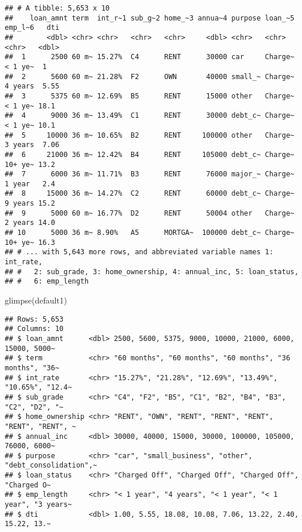 \documentclass[
]{article}
\newenvironment{Shaded}{\begin{snugshade}}{\end{snugshade}}
\newcommand{\FunctionTok}[1]{\textcolor[rgb]{0.00,0.00,0.00}{#1}}
\newcommand{\NormalTok}[1]{#1}
\begin{document}
\begin{verbatim}
## # A tibble: 5,653 x 10
##    loan_amnt term  int_r~1 sub_g~2 home_~3 annua~4 purpose loan_~5 emp_l~6   dti
##        <dbl> <chr> <chr>   <chr>   <chr>     <dbl> <chr>   <chr>   <chr>   <dbl>
##  1      2500 60 m~ 15.27%  C4      RENT      30000 car     Charge~ < 1 ye~  1   
##  2      5600 60 m~ 21.28%  F2      OWN       40000 small_~ Charge~ 4 years  5.55
##  3      5375 60 m~ 12.69%  B5      RENT      15000 other   Charge~ < 1 ye~ 18.1 
##  4      9000 36 m~ 13.49%  C1      RENT      30000 debt_c~ Charge~ < 1 ye~ 10.1 
##  5     10000 36 m~ 10.65%  B2      RENT     100000 other   Charge~ 3 years  7.06
##  6     21000 36 m~ 12.42%  B4      RENT     105000 debt_c~ Charge~ 10+ ye~ 13.2 
##  7      6000 36 m~ 11.71%  B3      RENT      76000 major_~ Charge~ 1 year   2.4 
##  8     15000 36 m~ 14.27%  C2      RENT      60000 debt_c~ Charge~ 9 years 15.2 
##  9      5000 60 m~ 16.77%  D2      RENT      50004 other   Charge~ 2 years 14.0 
## 10      5000 36 m~ 8.90%   A5      MORTGA~  100000 debt_c~ Charge~ 10+ ye~ 16.3 
## # ... with 5,643 more rows, and abbreviated variable names 1: int_rate,
## #   2: sub_grade, 3: home_ownership, 4: annual_inc, 5: loan_status,
## #   6: emp_length
\end{verbatim}

\begin{Shaded}
\begin{Highlighting}[]
\FunctionTok{glimpse}\NormalTok{(default1)}
\end{Highlighting}
\end{Shaded}

\begin{verbatim}
## Rows: 5,653
## Columns: 10
## $ loan_amnt      <dbl> 2500, 5600, 5375, 9000, 10000, 21000, 6000, 15000, 5000~
## $ term           <chr> "60 months", "60 months", "60 months", "36 months", "36~
## $ int_rate       <chr> "15.27%", "21.28%", "12.69%", "13.49%", "10.65%", "12.4~
## $ sub_grade      <chr> "C4", "F2", "B5", "C1", "B2", "B4", "B3", "C2", "D2", "~
## $ home_ownership <chr> "RENT", "OWN", "RENT", "RENT", "RENT", "RENT", "RENT", ~
## $ annual_inc     <dbl> 30000, 40000, 15000, 30000, 100000, 105000, 76000, 6000~
## $ purpose        <chr> "car", "small_business", "other", "debt_consolidation",~
## $ loan_status    <chr> "Charged Off", "Charged Off", "Charged Off", "Charged O~
## $ emp_length     <chr> "< 1 year", "4 years", "< 1 year", "< 1 year", "3 years~
## $ dti            <dbl> 1.00, 5.55, 18.08, 10.08, 7.06, 13.22, 2.40, 15.22, 13.~
\end{verbatim}
\end{document}
